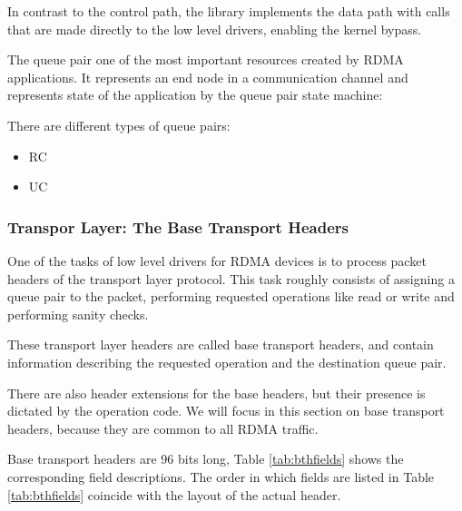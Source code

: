 In contrast to the control path,  the library implements the data path with calls that are made
directly to the low level drivers, enabling the kernel bypass\cite{}.

The queue pair one of the most important resources created by RDMA applications. It represents an end node
in a communication channel and represents state of the application by the queue pair state machine:

There are different types of queue pairs:
\begin{itemize}
  \item RC
  \item UC
\end{itemize}








\subsubsection{Transpor Layer: The Base Transport Headers} %

One of the tasks of low level drivers for RDMA devices is to process
packet headers of the transport layer protocol. This task roughly consists
of assigning a queue pair to the packet, performing requested operations like
read or write and performing sanity checks.

These transport layer headers are called
base transport headers, and contain information describing the
requested operation and the  destination queue pair.

There are also header extensions for the base headers, but their presence is dictated
by the operation code. We will focus in this section on base transport headers,
because they are common to all RDMA traffic.

Base transport headers are 96 bits long, Table
\ref{tab:bthfields} shows the corresponding field descriptions. The order in which fields
are listed in Table \ref{tab:bthfields} coincide with the layout of the actual header.

